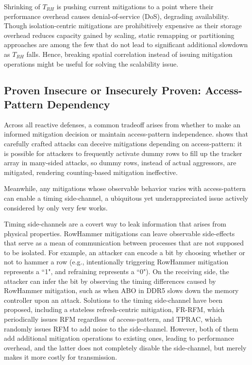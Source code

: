 \documentclass[journal,twocolumn]{IEEEtran}
\begin{document}
Shrinking of $T_{RH}$ is pushing current mitigations to a point where their performance overhead causes denial-of-service (DoS), degrading availability. Though isolation-centric mitigations are prohibitively expensive as their storage overhead reduces capacity gained by scaling, static remapping or partitioning approaches are among the few that do not lead to significant additional slowdown as $T_{RH}$ falls. Hence, breaking spatial correlation instead of issuing mitigation operations might be useful for solving the scalability issue.

\subsection{Proven Insecure or Insecurely Proven: Access-Pattern Dependency}

Across all reactive defenses, a common tradeoff arises from whether to make an informed mitigation decision or maintain access-pattern independence. \cite{Frigo20} shows that carefully crafted attacks can deceive mitigations depending on access-pattern: it is  possible for attackers to frequently activate dummy rows to fill up the tracker array in many-sided attacks, so dummy rows, instead of actual aggressors, are mitigated, rendering counting-based mitigation ineffective. 

Meanwhile, any mitigations whose observable behavior varies with access-pattern can enable a timing side-channel\cite{Woo25, Bostanci25}, a ubiquitous yet underappreciated issue actively considered by only very few works.

Timing side-channels are a covert way to leak information that arises from physical properties. RowHammer mitigations can leave observable side-effects that serve as a mean of communication between processes that are not supposed to be isolated. For example, an attacker can encode a bit by choosing whether or not to hammer a row (e.g., intentionally triggering RowHammer mitigation represents a ``1", and refraining represents a ``0"). On the receiving side, the attacker can infer the bit by observing the timing differences caused by RowHammer mitigation, such as when ABO in DDR5 slows down the memory controller upon an attack. Solutions to the timing side-channel have been proposed, including a stateless refresh-centric mitigation, FR-RFM\cite{Bostanci25}, which periodically issues RFM regardless of access-pattern, and TPRAC\cite{Woo25}, which randomly issues RFM to add noise to the side-channel. However, both of them add additional mitigation operations to existing ones, leading to performance overhead, and the latter does not completely disable the side-channel, but merely makes it more costly for transmission.
\end{document}
